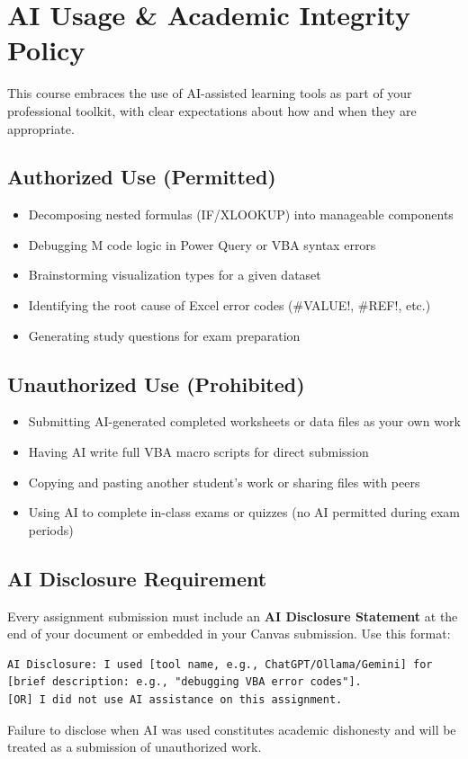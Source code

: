 \documentclass[11pt,a4paper]{article}
\begin{document}
\section*{AI Usage \& Academic Integrity Policy}

This course embraces the use of AI-assisted learning tools as part of your professional toolkit, with clear expectations about how and when they are appropriate.

\subsection*{Authorized Use (Permitted)}
\begin{itemize}[leftmargin=*]
    \item Decomposing nested formulas (IF/XLOOKUP) into manageable components
    \item Debugging M code logic in Power Query or VBA syntax errors
    \item Brainstorming visualization types for a given dataset
    \item Identifying the root cause of Excel error codes (\#VALUE!, \#REF!, etc.)
    \item Generating study questions for exam preparation
\end{itemize}

\subsection*{Unauthorized Use (Prohibited)}
\begin{itemize}[leftmargin=*]
    \item Submitting AI-generated completed worksheets or data files as your own work
    \item Having AI write full VBA macro scripts for direct submission
    \item Copying and pasting another student's work or sharing files with peers
    \item Using AI to complete in-class exams or quizzes (no AI permitted during exam periods)
\end{itemize}

\subsection*{AI Disclosure Requirement}
Every assignment submission must include an \textbf{AI Disclosure Statement} at the end of your document or embedded in your Canvas submission. Use this format:
\begin{verbatim}
AI Disclosure: I used [tool name, e.g., ChatGPT/Ollama/Gemini] for [brief description: e.g., "debugging VBA error codes"]. 
[OR] I did not use AI assistance on this assignment.
\end{verbatim}
Failure to disclose when AI was used constitutes academic dishonesty and will be treated as a submission of unauthorized work.
\end{document}
